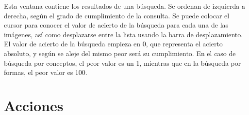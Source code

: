 Esta ventana contiene los resultados de una búsqueda. Se ordenan de izquierda a derecha, según el grado de cumplimiento de la consulta. Se puede colocar el cursor para conocer el valor de acierto de la búsqueda para cada una de las imágenes, así como desplazarse entre la lista usando la barra de desplazamiento.\\

El valor de acierto de la búsqueda empieza en 0, que representa el acierto absoluto, y según se aleje del mismo peor será su cumplimiento. En el caso de búsqueda por conceptos, el peor valor es un 1, mientras que en la búsqueda por formas, el peor valor es 100.\\



\newpage
\section{Acciones}
\label{acciones}

